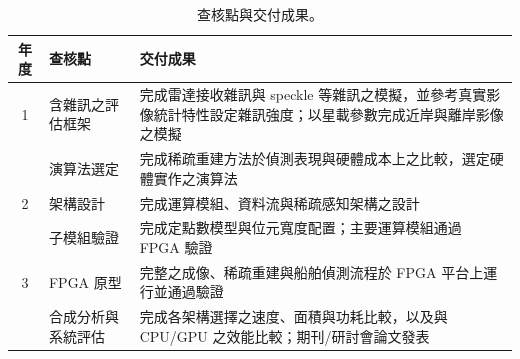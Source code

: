 \documentclass[11pt,fontset=none]{ctexart}
\begin{document}
\begin{table}[H]
  \centering
  \footnotesize
  \caption{查核點與交付成果。}
  \label{tab:milestones}
  \begin{tabularx}{\textwidth}{c l X}
    \toprule
    年度 & 查核點 & 交付成果 \\
    \midrule
    1 & 含雜訊之評估框架 & 完成雷達接收雜訊與 speckle 等雜訊之模擬，並參考真實影像統計特性設定雜訊強度；以星載參數完成近岸與離岸影像之模擬 \\
      & 演算法選定 & 完成稀疏重建方法於偵測表現與硬體成本上之比較，選定硬體實作之演算法 \\
    \midrule
    2 & 架構設計 & 完成運算模組、資料流與稀疏感知架構之設計 \\
      & 子模組驗證 & 完成定點數模型與位元寬度配置；主要運算模組通過 FPGA 驗證 \\
    \midrule
    3 & FPGA 原型 & 完整之成像、稀疏重建與船舶偵測流程於 FPGA 平台上運行並通過驗證 \\
      & 合成分析與系統評估 & 完成各架構選擇之速度、面積與功耗比較，以及與 CPU/GPU 之效能比較；期刊/研討會論文發表 \\
    \bottomrule
  \end{tabularx}
\end{table}
\end{document}
